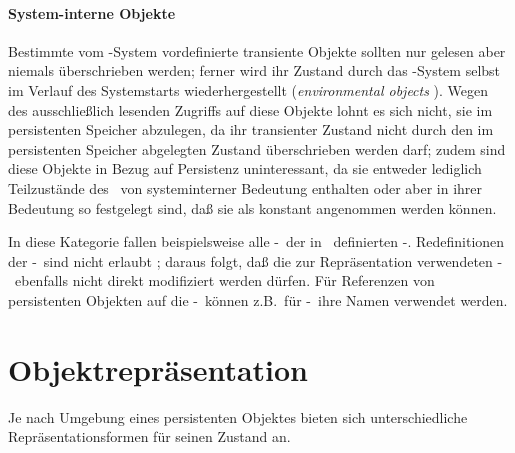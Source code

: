 \paragraph{System-interne Objekte}%
%
Bestimmte vom \cl-System vordefinierte transiente Objekte sollten nur
gelesen aber niemals \"{u}berschrieben werden; ferner wird ihr Zustand
durch das \cl-System selbst im Verlauf des Systemstarts
wiederhergestellt ({\em environmental objects\/}
\cite[]{bib:fo88}). Wegen des ausschlie\ss{}lich
lesenden Zugriffs auf diese Objekte lohnt es sich nicht, sie im
persistenten Speicher abzulegen, da ihr transienter Zustand nicht
durch den im persistenten Speicher abgelegten Zustand \"{u}berschrieben
werden darf; zudem sind diese Objekte in Bezug auf Persistenz
\rglq{}uninteressant\rgrq, da sie entweder lediglich Teilzust\"{a}nde des
\cl\ von systeminterner Bedeutung enthalten oder aber in ihrer
Bedeutung so festgelegt sind, da\ss{} sie als konstant angenommen werden
k\"{o}nnen.
%
\par{}In diese Kategorie fallen beispielsweise alle \std-\mo[e]\ der
in \cite{bib:amop91}\ definierten \std-\mc[n]. Redefinitionen der
\std-\mc[n]\ sind nicht erlaubt ; daraus folgt, da\ss{} die
zur Repr\"{a}sentation verwendeten \std-\mo[e]\ ebenfalls nicht direkt
modifiziert werden d\"{u}rfen. F\"{u}r Referenzen von persistenten Objekten
auf die \std-\mo[e]\ k\"{o}nnen z.B.\ f\"{u}r \std-\clsmc[n]\ ihre Namen
verwendet werden.
%
\section{Objektrepr\"{a}sentation}
%
Je nach Umgebung eines persistenten Objektes bieten sich
unterschiedliche Re\-pr\"{a}\-sen\-ta\-tions\-for\-men f\"{u}r seinen
Zustand an.
%
